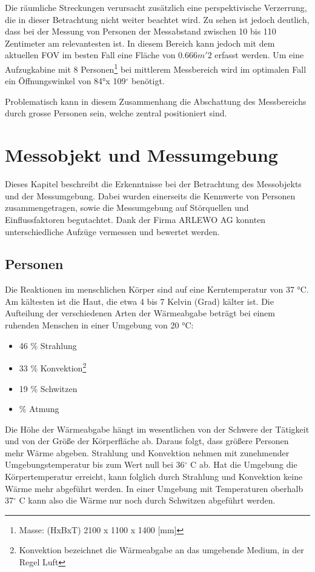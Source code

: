 Die räumliche Streckungen verursacht zusätzlich eine perspektivische Verzerrung, die in dieser Betrachtung nicht weiter beachtet wird. Zu sehen ist jedoch deutlich, dass bei der Messung von Personen der Messabstand zwischen 10 bis 110 Zentimeter am relevantesten ist. In diesem Bereich kann jedoch mit dem aktuellen \ac{FOV} im besten Fall eine Fläche von 0.666$m'2$ erfasst werden. Um eine Aufzugkabine mit 8 Personen\footnote[6]{Masse: (HxBxT) 2100 x 1100 x 1400 [mm]} bei mittlerem Messbereich wird im optimalen Fall ein Öffnungswinkel von 84°x 109$^\circ$ benötigt. 

Problematisch kann in diesem Zusammenhang die Abschattung des Messbereichs durch grosse Personen sein, welche zentral positioniert sind. 

 

\section{Messobjekt und Messumgebung}
\label{sec:Messobjekt}
Dieses Kapitel beschreibt die Erkenntnisse bei der Betrachtung des Messobjekts und der Messumgebung. Dabei wurden einerseits die Kennwerte von Personen zusammengetragen, sowie die Messumgebung auf Störquellen und Einflussfaktoren begutachtet. Dank der Firma ARLEWO AG konnten unterschiedliche Aufzüge vermessen und bewertet werden. 

\subsection{Personen}
\label{subsec:Personen}

Die Reaktionen im menschlichen Körper sind auf eine Kerntemperatur von 37 °C. Am kältesten ist die Haut, die etwa 4 bis 7 Kelvin (Grad) kälter ist. Die Aufteilung der verschiedenen Arten der Wärmeabgabe beträgt bei einem ruhenden Menschen in einer Umgebung von 20 °C:


\begin{itemize}
	\item 46 \% Strahlung
	\item 33 \% Konvektion\footnote[7]{Konvektion bezeichnet die Wärmeabgabe an
		das umgebende Medium, in der Regel Luft}
	\item 19 \% Schwitzen
	\item {} \% Atmung
\end{itemize}

Die Höhe der Wärmeabgabe hängt im wesentlichen von der Schwere der Tätigkeit und von der Größe der Körperfläche ab. Daraus folgt, dass größere Personen mehr Wärme abgeben. Strahlung und Konvektion nehmen mit zunehmender Umgebungstemperatur bis zum Wert null bei 36$^\circ$ C ab. Hat die Umgebung die Körpertemperatur erreicht, kann folglich durch Strahlung und Konvektion keine Wärme mehr abgeführt werden. In einer Umgebung mit Temperaturen oberhalb 37$^\circ$ C kann also die Wärme nur noch durch Schwitzen abgeführt werden.\protect\cite{MenschWaerme}

